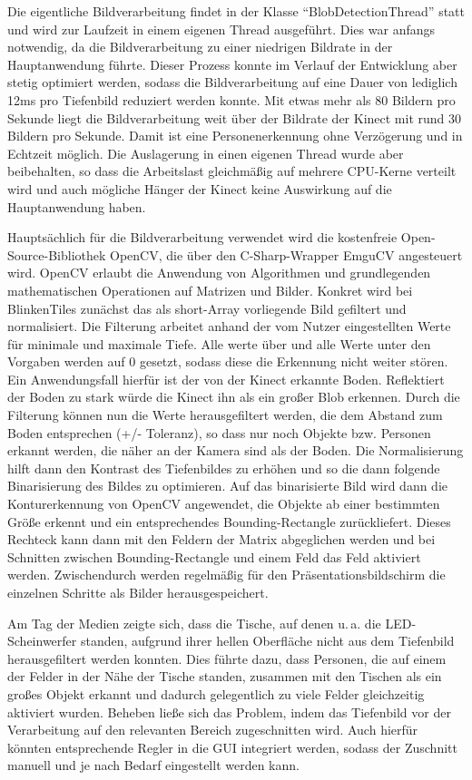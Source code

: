 Die eigentliche Bildverarbeitung findet in der Klasse \enquote{BlobDetectionThread} statt und wird zur Laufzeit in einem eigenen Thread ausgeführt. Dies war anfangs notwendig, da die Bildverarbeitung zu einer niedrigen Bildrate in der Hauptanwendung führte. Dieser Prozess konnte im Verlauf der Entwicklung aber stetig optimiert werden, sodass die Bildverarbeitung auf eine Dauer von lediglich 12ms pro Tiefenbild reduziert werden konnte. Mit etwas mehr als 80 Bildern pro Sekunde liegt die Bildverarbeitung weit über der Bildrate der Kinect mit rund 30 Bildern pro Sekunde. Damit ist eine Personenerkennung ohne Verzögerung und in Echtzeit möglich. Die Auslagerung in einen eigenen Thread wurde aber beibehalten, so dass die Arbeitslast gleichmäßig auf mehrere CPU-Kerne verteilt wird und auch mögliche Hänger der Kinect keine Auswirkung auf die Hauptanwendung haben.

Hauptsächlich für die Bildverarbeitung verwendet wird die kostenfreie Open-Source-Bibliothek OpenCV, die über den C-Sharp-Wrapper EmguCV angesteuert wird. OpenCV erlaubt die Anwendung von Algorithmen und grundlegenden mathematischen Operationen auf Matrizen und Bilder. Konkret wird bei BlinkenTiles zunächst das als short-Array vorliegende Bild gefiltert und normalisiert. Die Filterung arbeitet anhand der vom Nutzer eingestellten Werte für minimale und maximale Tiefe. Alle werte über und alle Werte unter den Vorgaben werden auf 0 gesetzt, sodass diese die Erkennung nicht weiter stören. Ein Anwendungsfall hierfür ist der von der Kinect erkannte Boden. Reflektiert der Boden zu stark würde die Kinect ihn als ein großer Blob erkennen. Durch die Filterung können nun die Werte herausgefiltert werden, die dem Abstand zum Boden entsprechen (+/- Toleranz), so dass nur noch Objekte bzw. Personen erkannt werden, die näher an der Kamera sind als der Boden. Die Normalisierung hilft dann den Kontrast des Tiefenbildes zu erhöhen und so die dann folgende Binarisierung des Bildes zu optimieren. Auf das binarisierte Bild wird dann die Konturerkennung von OpenCV angewendet, die Objekte ab einer bestimmten Größe erkennt und ein entsprechendes Bounding-Rectangle zurückliefert. Dieses Rechteck kann dann mit den Feldern der Matrix abgeglichen werden und bei Schnitten zwischen Bounding-Rectangle und einem Feld das Feld aktiviert werden. Zwischendurch werden regelmäßig für den Präsentationsbildschirm die einzelnen Schritte als Bilder herausgespeichert.

Am Tag der Medien zeigte sich, dass die Tische, auf denen u.\,a. die LED-Scheinwerfer standen, aufgrund ihrer hellen Oberfläche nicht aus dem Tiefenbild herausgefiltert werden konnten. Dies führte dazu, dass Personen, die auf einem der Felder in der Nähe der Tische standen, zusammen mit den Tischen als ein großes Objekt erkannt und dadurch gelegentlich zu viele Felder gleichzeitig aktiviert wurden. Beheben ließe sich das Problem, indem das Tiefenbild vor der Verarbeitung auf den relevanten Bereich zugeschnitten wird. Auch hierfür könnten entsprechende Regler in die GUI integriert werden, sodass der Zuschnitt manuell und je nach Bedarf eingestellt werden kann.

